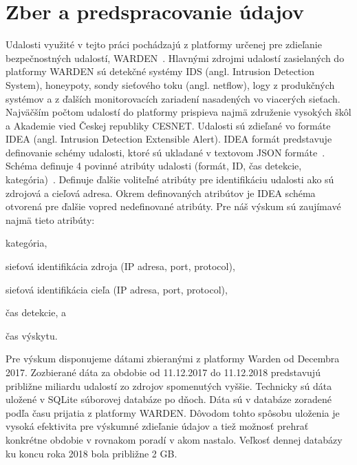 \documentclass[thesismargins, thesislinespacing, openright, upjsfrontpage, combineabstracts]{rnthesis}
\begin{document}
\section{Zber a predspracovanie údajov}

Udalosti využité v tejto práci pochádzajú z platformy určenej pre zdieľanie bezpečnostných udalostí, WARDEN~\cite{kacha2015warden}. Hlavnými zdrojmi udalostí zasielaných do platformy WARDEN sú detekčné systémy IDS (angl. Intrusion Detection System), honeypoty, sondy sieťového toku (angl. netflow), logy z produkčných systémov a z ďalších monitorovacích zariadení nasadených vo viacerých sieťach. Najväčším počtom udalostí do platformy prispieva najmä združenie vysokých škôl a Akademie vied Českej republiky CESNET. Udalosti sú zdieľané vo formáte IDEA (angl. Intrusion Detection Extensible Alert). IDEA formát predstavuje definovanie schémy udalosti, ktoré sú ukladané v textovom JSON formáte~\cite{pezoa2016foundations}. Schéma definuje 4 povinné atribúty udalosti (formát, ID, čas detekcie, kategória)~\cite{kacha2014idea}. Definuje ďalšie voliteľné atribúty pre identifikáciu udalosti ako sú zdrojová a cieľová adresa. Okrem definovaných atribútov je IDEA schéma otvorená pre ďalšie vopred nedefinované atribúty. Pre náš výskum sú zaujímavé najmä tieto atribúty:

\begin{compactenum}
\item kategória, 
\item sieťová identifikácia zdroja (IP adresa, port, protocol), 
\item sieťová identifikácia cieľa (IP adresa, port, protocol), 
\item čas detekcie, a
\item čas výskytu.
\end{compactenum}

Pre výskum disponujeme dátami zbieranými z platformy Warden od Decembra 2017. Zozbierané dáta za obdobie od 11.12.2017 do 11.12.2018 predstavujú približne miliardu udalostí zo zdrojov spomenutých vyššie. Technicky sú dáta uložené v SQLite súborovej databáze po dňoch. Dáta sú v databáze zoradené podľa času prijatia z platformy WARDEN. Dôvodom tohto spôsobu uloženia je vysoká efektivita pre výskumné zdieľanie údajov a tiež možnosť prehrať konkrétne obdobie v rovnakom poradí v akom nastalo. Veľkosť dennej databázy ku koncu roka 2018 bola približne 2 GB.
\end{document}
